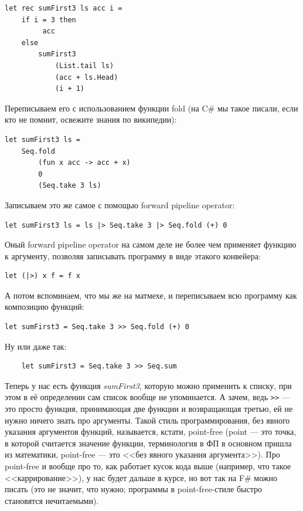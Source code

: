 \documentclass{../../text-style}
\begin{document}
\begin{verbatim}
let rec sumFirst3 ls acc i =
    if i = 3 then 
         acc 
    else 
        sumFirst3 
            (List.tail ls) 
            (acc + ls.Head) 
            (i + 1)
\end{verbatim}

Переписываем его с использованием функции fold (на C\# мы такое писали, если кто не помнит, освежите знания по википедии):

\begin{verbatim}
let sumFirst3 ls = 
    Seq.fold 
        (fun x acc -> acc + x) 
        0 
        (Seq.take 3 ls)
\end{verbatim}

Записываем это же самое с помощью forward pipeline operator:
\begin{verbatim}
let sumFirst3 ls = ls |> Seq.take 3 |> Seq.fold (+) 0
\end{verbatim}

Оный  forward pipeline operator на самом деле не более чем применяет функцию к аргументу, позволяя записывать программу в виде этакого конвейера:
\begin{verbatim}
let (|>) x f = f x
\end{verbatim}

А потом вспоминаем, что мы же на матмехе, и переписываем всю программу как композицию функций:

\begin{verbatim}
let sumFirst3 = Seq.take 3 >> Seq.fold (+) 0
\end{verbatim}

Ну или даже так:

\begin{verbatim}
    let sumFirst3 = Seq.take 3 >> Seq.sum
\end{verbatim}

Теперь у нас есть функция \textit{sumFirst3}, которую можно применить к списку, при этом в её определении сам список вообще не упоминается. А зачем, ведь \verb|>>| --- это просто функция, принимающая две функции и возвращающая третью, ей не нужно ничего знать про аргументы. Такой стиль программирования, без явного указания аргументов функций, называется, кстати, point-free (point --- это точка, в которой считается значение функции, терминология в ФП в основном пришла из математики, point-free --- это <<без явного указания аргумента>>). Про point-free и вообще про то, как работает кусок кода выше (например, что такое <<каррирование>>), у нас будет дальше в курсе, но вот так на F\# можно писать (это не значит, что нужно; программы в point-free-стиле быстро становятся нечитаемыми).
\end{document}
